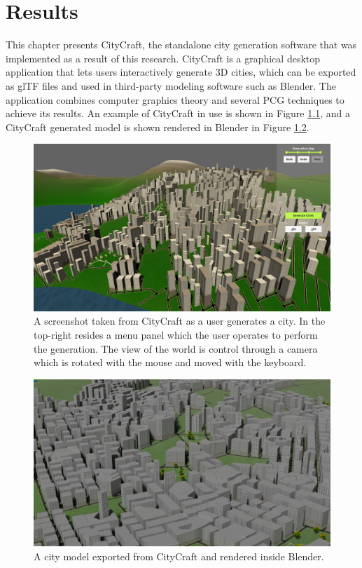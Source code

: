 \chapter{Results}

This chapter presents CityCraft, the standalone city generation software that was implemented as a result of this research.
CityCraft is a graphical desktop application that lets users interactively generate 3D cities, which can be exported as glTF files and used in third-party modeling software such as Blender.
The application combines computer graphics theory and several PCG techniques to achieve its results.
An example of CityCraft in use is shown in Figure \ref{fig:screenshot}, and a CityCraft generated model is shown rendered in Blender in Figure \ref{fig:blender}.

\begin{figure}[H]
  \centering
  \includegraphics[width=\textwidth]{figure/results/screenshot.png}

  \caption{A screenshot taken from CityCraft as a user generates a city. In the top-right resides a menu panel which the user operates to perform the generation. The view of the world is control through a camera which is rotated with the mouse and moved with the keyboard.}
  \label{fig:screenshot}
\end{figure}

\begin{figure}[H]
  \centering
  \includegraphics[width=\textwidth]{figure/results/blender_render}

  \caption{A city model exported from CityCraft and rendered inside Blender.}
  \label{fig:blender}
\end{figure}

